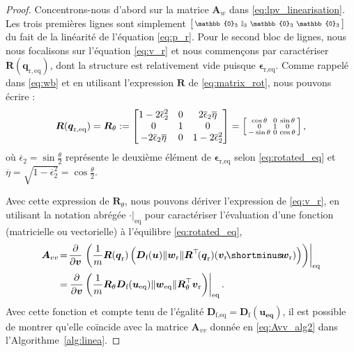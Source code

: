 \begin{proof}
Concentrons-nous d'abord sur la matrice $\boldsymbol{A}_w$ dans \eqref{eq:lpv_linearisation}. Les trois premières lignes sont simplement $\smallmat{\mathbb{0}_{3} & \mathbb{I}_{3} & \mathbb{0}_{3} &\mathbb{0}_{3}}$ du fait de la linéarité de l'équation \eqref{eq:p_r}. 
Pour le second bloc de lignes, nous nous focalisons sur l'équation \eqref{eq:v_r} et nous commençons par caractériser $\boldsymbol{R}(\boldsymbol{q}_{\mathrm{r,eq}})$, dont la structure est relativement vide puisque $\boldsymbol{\epsilon}_{\text{r,eq}}$. Comme rappelé dans \eqref{eq:wb} et en utilisant l'expression $\boldsymbol{R}$ de \eqref{eq:matrix_rot}, nous pouvons écrire :
\begin{align*}
    \boldsymbol{R}(\boldsymbol{q}_{\mathrm{r,eq}\textbf{}})= \boldsymbol{R}_\theta :=
     \begin{bmatrix}1-2\overline \epsilon_{2}^{2} & 0 & 2\overline\epsilon_{2} \overline{\eta} \\ 0 & 1 & 0 \\ -2\overline\epsilon_{2} \overline{\eta} & 0 & 1-2\overline\epsilon_{2}^{2} \end{bmatrix}
    = \left[ \begin{smallmatrix} \cos \theta & 0 & \sin \theta \\ 0 & 1 & 0 \\ -\sin \theta & 0 & \cos \theta  \end{smallmatrix} \right],
\end{align*}
où $\overline \epsilon_{2} = \sin{\frac{\theta}{2}}$ représente le deuxième élément de $\boldsymbol{\epsilon}_{\text{r,eq}}$ selon \eqref{eq:rotated_eq} et $ \overline{\eta} = \sqrt{1-\overline \epsilon_{2}^{2}} = \cos{\frac{\theta}{2}}$.

Avec cette expression de $ \boldsymbol{R}_\theta$, nous pouvons dériver l'expression de \eqref{eq:v_r}, en utilisant la notation abrégée $\left. \cdot \right|_{\text{eq}}$ pour caractériser l'évaluation d'une fonction (matricielle ou vectorielle) à l'équilibre \eqref{eq:rotated_eq},
\begin{align}
\nonumber
\boldsymbol{A}_{vv} &\!=\! \frac{\partial }{\partial \boldsymbol{v}}  \left. \left( \frac{1}{m} \boldsymbol{R}(\boldsymbol{q}_{\text{r}}) \left( %
\boldsymbol{D}_{\text{f}}(\boldsymbol{u}) \lVert \boldsymbol{w}_{\text{r}} \rVert \boldsymbol{R}^\top \!(\boldsymbol{q}_{\mathrm{r}}) ( \boldsymbol{v}_{\mathrm{r}} \! \shortminus \! \boldsymbol{w}_{\text{r}})  \right) \right)\right|_{\text{eq}}\\
&\!=\!  \left. \frac{\partial }{\partial \boldsymbol{v}} \left( \frac{1}{m}  \boldsymbol{R}_\theta  \boldsymbol{D}_{\text{f}}(\boldsymbol{u_{\text{eq}}}) \lVert \boldsymbol{w}_{\mathrm{eq}} \rVert   \boldsymbol{R}_\theta^\top  \boldsymbol{v}_{\mathrm{r}} \right) \right|_{\text{eq}}.
\label{eq:Avv_derivation}
\end{align} 
Avec cette fonction et compte tenu de l'égalité $\boldsymbol{D}_{\text{f,eq}} = \boldsymbol{D}_{\text{f}}(\boldsymbol{u_{\text{eq}}})$, il est possible de montrer qu'elle coïncide avec la matrice
$\boldsymbol{A}_{vv}$ donnée en \eqref{eq:Avv_alg2} dans l'Algorithme~\ref{alg:linea}.


\end{proof}
